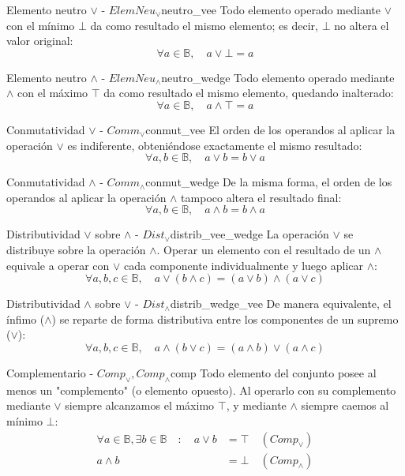 \documentclass[12pt,a4paper]{article}
\begin{document}
\begin{postulado}{Elemento neutro $\vee$ - $ElemNeu_\vee$}{neutro_vee}
Todo elemento operado mediante $\vee$ con el mínimo $\bot$ da como resultado el mismo elemento; es decir, $\bot$ no altera el valor original:
\[ \forall a \in \mathbb{B}, \quad a \vee \bot = a \]
\end{postulado}

\begin{postulado}{Elemento neutro $\wedge$ - $ElemNeu_\wedge$}{neutro_wedge}
Todo elemento operado mediante $\wedge$ con el máximo $\top$ da como resultado el mismo elemento, quedando inalterado:
\[ \forall a \in \mathbb{B}, \quad a \wedge \top = a \]
\end{postulado}

\begin{postulado}{Conmutatividad $\vee$ - $Comm_\vee$}{conmut_vee}
El orden de los operandos al aplicar la operación $\vee$ es indiferente, obteniéndose exactamente el mismo resultado:
\[ \forall a, b \in \mathbb{B}, \quad a \vee b = b \vee a \]
\end{postulado}

\begin{postulado}{Conmutatividad $\wedge$ - $Comm_\wedge$}{conmut_wedge}
De la misma forma, el orden de los operandos al aplicar la operación $\wedge$ tampoco altera el resultado final:
\[ \forall a, b \in \mathbb{B}, \quad a \wedge b = b \wedge a \]
\end{postulado}

\begin{postulado}{Distributividad $\vee$ sobre $\wedge$ - $Dist_\vee$}{distrib_vee_wedge}
La operación $\vee$ se distribuye sobre la operación $\wedge$. Operar un elemento con el resultado de un $\wedge$ equivale a operar con $\vee$ cada componente individualmente y luego aplicar $\wedge$:
\[ \forall a, b, c \in \mathbb{B}, \quad a \vee (b \wedge c) = (a \vee b) \wedge (a \vee c) \]
\end{postulado}

\begin{postulado}{Distributividad $\wedge$ sobre $\vee$ - $Dist_\wedge$}{distrib_wedge_vee}
De manera equivalente, el ínfimo ($\wedge$) se reparte de forma distributiva entre los componentes de un supremo ($\vee$):
\[ \forall a, b, c \in \mathbb{B}, \quad a \wedge (b \vee c) = (a \wedge b) \vee (a \wedge c) \]
\end{postulado}

\begin{postulado}{Complementario - $Comp_\vee, Comp_\wedge$}{comp}
Todo elemento del conjunto posee al menos un "complemento" (o elemento opuesto). Al operarlo con su complemento mediante $\vee$ siempre alcanzamos el máximo $\top$, y mediante $\wedge$ siempre caemos al mínimo $\bot$:
\begin{align*}
\forall a \in \mathbb{B}, \exists b \in \mathbb{B} \quad : \quad a \vee b &= \top \quad (Comp_\vee) \\
a \wedge b &= \bot \quad (Comp_\wedge)
\end{align*}
\end{postulado}
\end{document}
